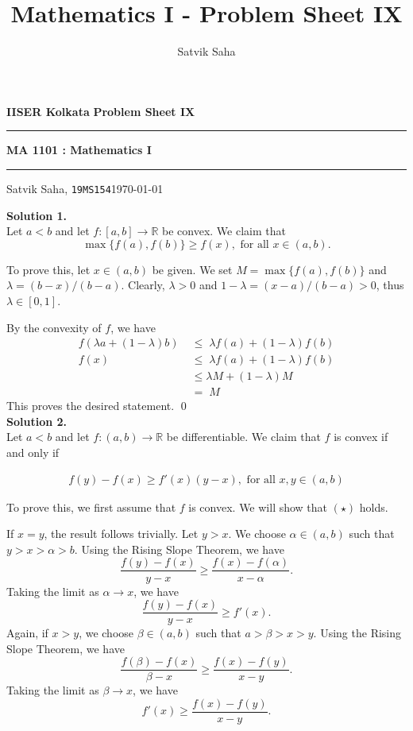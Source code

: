 \documentclass[10pt]{article}
\title{Mathematics I - Problem Sheet IX}
\author{Satvik Saha}
\date{}
\begin{document}
        \par\textbf{IISER Kolkata} \hfill \textbf{Problem Sheet IX}
        \vspace{3pt}
        \hrule
        \vspace{3pt}
        \begin{center}
                \LARGE{\textbf{MA 1101 : Mathematics I}}
        \end{center}
        \vspace{3pt}
        \hrule
        \vspace{3pt}
        Satvik Saha, \texttt{19MS154}\hfill\today
        \vspace{20pt}

        \textbf{Solution 1.}\\
        Let $a < b$ and let $f\colon [a, b] \to \mathbb{R}$ be convex. We claim that
        \[\max\{f(a), f(b)\} \ge f(x), \text{ for all } x \in (a, b).\]

        To prove this, let $x \in (a, b)$ be given. We set $M = \max\{f(a), f(b)\}$ and $\lambda = (b - x)/(b - a)$.
        Clearly, $\lambda > 0$ and $1 - \lambda = (x - a)/(b - a) > 0$, thus $\lambda \in [0, 1]$.

        By the convexity of $f$, we have
        \begin{align*}
                f(\lambda a + (1 - \lambda)b) \;&\le\; \lambda f(a) + (1 - \lambda)f(b) \\
                f(x) \;&\le\; \lambda f(a) + (1 - \lambda)f(b) \\
                        \;&\le \lambda M + (1 - \lambda)M \\
                        \;&=\; M
        \end{align*}
        This proves the desired statement. \qed\\

        \textbf{Solution 2.}\\
        Let $a < b$ and let $f \colon (a, b) \to \mathbb{R}$ be differentiable. We claim that $f$ is convex if and only if 
        
        \begin{align*}
        f(y) - f(x) \ge f'(x)(y - x), \text{ for all } x, y \in (a, b) \tag{$\star$}
        \end{align*}

        To prove this, we first assume that $f$ is convex. We will show that $(\star)$ holds.

        If $x = y$, the result follows trivially. Let $y > x$.
        We choose $\alpha \in (a, b)$ such that $y > x > \alpha > b$. Using the Rising Slope Theorem, we have
        \[\frac{f(y) - f(x)}{y - x} \ge \frac{f(x) - f(\alpha)}{x - \alpha}.\]
        Taking the limit as $\alpha \to x$, we have
        \[\frac{f(y) - f(x)}{y - x} \ge f'(x).\]
        Again, if $x > y$, we choose $\beta \in (a, b)$ such that $a > \beta > x > y$. Using the Rising Slope Theorem, we have
        \[\frac{f(\beta) - f(x)}{\beta - x} \ge \frac{f(x) - f(y)}{x - y}.\]
        Taking the limit as $\beta \to x$, we have
        \[f'(x) \ge \frac{f(x) - f(y)}{x - y}.\]
        
\end{document}

